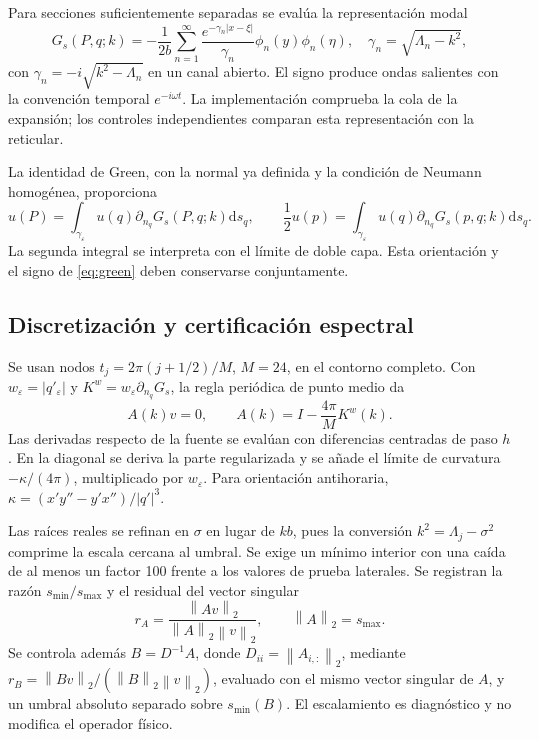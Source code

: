 \documentclass[11pt]{article}
\newcommand{\eps}{\varepsilon}
\newcommand{\dd}{\mathrm{d}}
\newcommand{\norm}[1]{\left\lVert#1\right\rVert}
\begin{document}
Para secciones suficientemente separadas se evalúa la representación modal
\begin{equation}
 G_s(P,q;k)=-\frac{1}{2b}\sum_{n=1}^{\infty}
 \frac{e^{-\gamma_n|x-\xi|}}{\gamma_n}\phi_n(y)\phi_n(\eta),
 \quad \gamma_n=\sqrt{\Lambda_n-k^2},\label{eq:modal}
\end{equation}
con $\gamma_n=-i\sqrt{k^2-\Lambda_n}$ en un canal abierto. El signo produce ondas salientes con la convención temporal $e^{-i\omega t}$. La implementación comprueba la cola de la expansión; los controles independientes comparan esta representación con la reticular.

La identidad de Green, con la normal ya definida y la condición de Neumann homogénea, proporciona
\begin{equation}
 u(P)=\int_{\gamma_\eps}u(q)\partial_{n_q}G_s(P,q;k)\dd s_q,
 \qquad \frac12u(p)=\int_{\gamma_\eps}u(q)\partial_{n_q}G_s(p,q;k)\dd s_q.
 \label{eq:bie}
\end{equation}
La segunda integral se interpreta con el límite de doble capa. Esta orientación y el signo de \eqref{eq:green} deben conservarse conjuntamente.

\subsection{Discretización y certificación espectral}
Se usan nodos $t_j=2\pi(j+1/2)/M$, $M=24$, en el contorno completo. Con $w_\eps=|q'_\eps|$ y $K^w=w_\eps\partial_{n_q}G_s$, la regla periódica de punto medio da
\begin{equation}
 A(k)v=0,\qquad A(k)=I-\frac{4\pi}{M}K^w(k).\label{eq:matrix}
\end{equation}
Las derivadas respecto de la fuente se evalúan con diferencias centradas de paso $h$. En la diagonal se deriva la parte regularizada y se añade el límite de curvatura $-\kappa/(4\pi)$, multiplicado por $w_\eps$. Para orientación antihoraria, $\kappa=(x'y''-y'x'')/|q'|^3$.

Las raíces reales se refinan en $\sigma$ en lugar de $kb$, pues la conversión $k^2=\Lambda_j-\sigma^2$ comprime la escala cercana al umbral. Se exige un mínimo interior con una caída de al menos un factor 100 frente a los valores de prueba laterales. Se registran la razón $s_{\min}/s_{\max}$ y el residual del vector singular
\begin{equation}
 r_A=\frac{\norm{Av}_2}{\norm{A}_2\norm{v}_2},\qquad
 \norm A_2=s_{\max}.\label{eq:residual}
\end{equation}
Se controla además $B=D^{-1}A$, donde $D_{ii}=\norm{A_{i,:}}_2$, mediante $r_B=\norm{Bv}_2/(\norm{B}_2\norm{v}_2)$, evaluado con el mismo vector singular de $A$, y un umbral absoluto separado sobre $s_{\min}(B)$. El escalamiento es diagnóstico y no modifica el operador físico.
\end{document}
